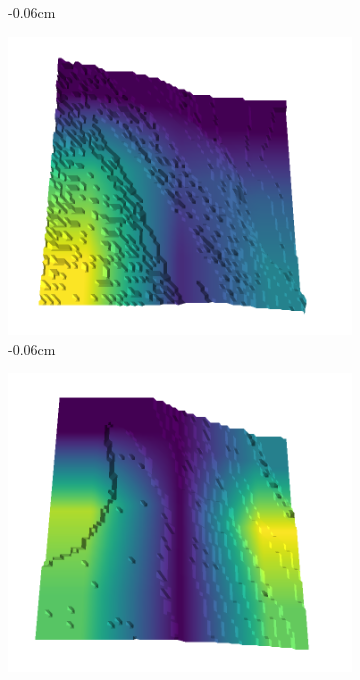\documentclass[../document.tex]{subfiles}
\begin{document}
\begin{figure}[H]
\begin{subfigure}[b]{0.242\linewidth}
        \caption{-0.06cm}
        \end{subfigure}
        \begin{subfigure}[b]{0.242\linewidth}
        \includegraphics[width=\linewidth]{../img/5/quarry/false_negative/02-patch-3d-majavi-colormap-30.png}
        \caption{-0.06cm}
        \end{subfigure}
        \begin{subfigure}[b]{0.242\linewidth}
        \includegraphics[width=\linewidth]{../img/5/quarry/false_negative/03-patch-3d-majavi-colormap-35.png}

\end{subfigure}
\end{figure}
\end{document}
